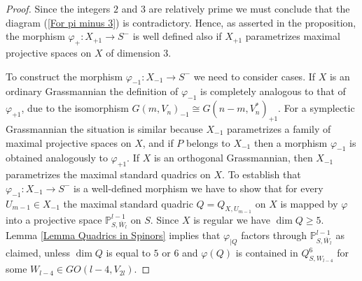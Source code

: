 \documentclass[12pt]{amsart}
\def\PP {{\mathbb P}}     %
\begin{document}
\begin{proof}
Since the integers $2$ and $3$ are relatively prime we must conclude that the diagram (\ref{For pi minus 3}) is contradictory. Hence, as asserted in the proposition, the morphism $\varphi_+:X_{+1}\to S^{-}$ is well defined also if $X_{+1}$ parametrizes maximal projective spaces on $X$ of dimension $3$.

To construct the morphism $\varphi_{-1}:X_{-1}\to S^{-}$ we need to consider cases. If $X$ is an ordinary Grassmannian the definition of $\varphi_{-1}$ is completely analogous to that of $\varphi_{+1}$, due to the isomorphism $G(m,V_{n})_{-1} \cong G(n-m,V_{n}^*)_{+1}$. For a symplectic Grassmannian the situation is similar because $X_{-1}$ parametrizes a family of maximal projective spaces on $X$, and if $P$ belongs to $X_{-1}$ then a morphism $\varphi_{-1}$ is obtained analogously to $\varphi_{+1}$. If $X$ is an orthogonal Grassmannian, then $X_{-1}$ parametrizes the maximal standard quadrics on $X$. To establish that $\varphi_{-1}:X_{-1}\to S^{-}$ is a well-defined morphism we have to show that for every $U_{m-1}\in X_{-1}$ the maximal standard quadric $Q=Q_{X,U_{m-1}}$ on $X$ is mapped by $\varphi$ into a projective space $\PP^{l-1}_{S,\bar W_l}$ on $S$. Since $X$ is regular we have $\dim Q\geq 5$. Lemma \ref{Lemma Quadrics in Spinors} implies that $\varphi_{\vert Q}$ factors through $\PP^{l-1}_{S,\bar W_l}$ as claimed, unless $\dim Q$ is equal to $5$ or $6$ and $\varphi(Q)$ is contained in $Q^6_{S,W_{l-4}}$ for some $W_{l-4}\in GO(l-4,V_{2l})$. 


\end{proof}
\end{document}
